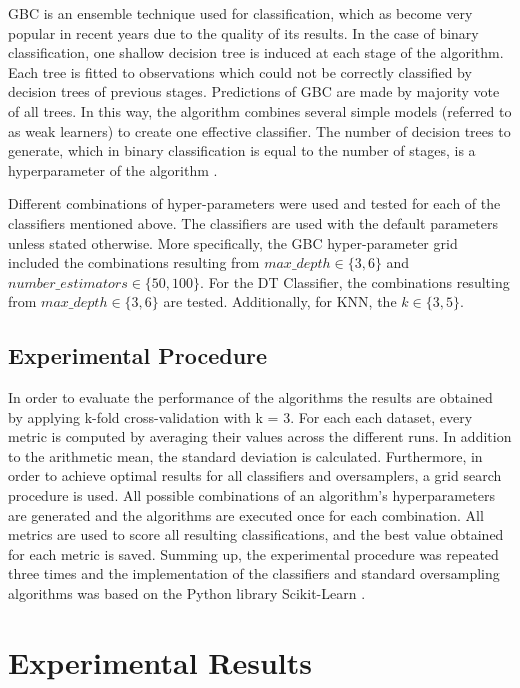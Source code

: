 \documentclass[parskip=full]{scrartcl}
\begin{document}
GBC is an ensemble technique used for classification, which as become very 
popular in recent years due to the quality of its results. In the case of 
binary classification, one shallow decision tree is induced at each stage of 
the algorithm. Each tree is fitted to observations which could not be correctly 
classified by decision trees of previous stages. Predictions of GBC are made by 
majority vote of all trees. In this way, the algorithm combines several simple 
models (referred to as weak learners) to create one effective classifier. The 
number of decision trees to generate, which in binary classification is equal 
to the number of stages, is a hyperparameter of the algorithm 
\cite{Friedman2001}.

Different combinations of hyper-parameters were used and tested for each of the 
classifiers mentioned above. The classifiers are used with the default 
parameters unless stated otherwise. More specifically, the GBC hyper-parameter 
grid included the combinations resulting from $max\_depth \in \{3, 6\}$ and $number\_estimators \in \{50, 100\}$. For the DT Classifier, the combinations resulting from $max\_depth \in \{3, 6\}$ are tested. Additionally, for KNN, the $k \in \{3, 5\}$.

\subsection{Experimental Procedure}

In order to evaluate the performance of the algorithms the results are obtained 
by applying k-fold cross-validation with k = 3. For each each dataset, every 
metric is computed by averaging their values across the different runs. In 
addition to the arithmetic mean, the standard deviation is calculated. 
Furthermore, in order to achieve optimal results for all classifiers and 
oversamplers, a grid search procedure is used. All possible combinations of an 
algorithm’s hyperparameters are generated and the algorithms are executed once 
for each combination. All metrics are used to score all resulting 
classifications, and the best value obtained for each metric is saved. Summing 
up, the experimental procedure was repeated three times and the implementation 
of the classifiers and standard oversampling algorithms was based on the Python 
library Scikit-Learn \cite{Pedregosa2011}. 

\section{Experimental Results}
\end{document}
